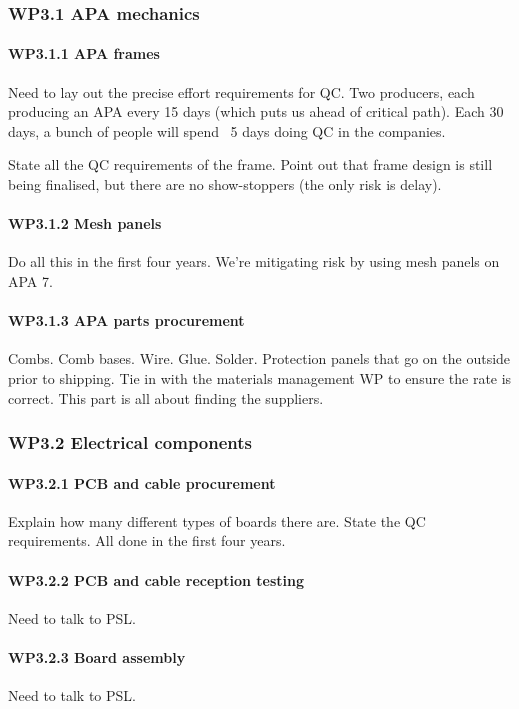 \subsubsection{WP3.1 APA mechanics}
\paragraph{WP3.1.1 APA frames}
Need to lay out the precise effort requirements for QC. Two producers, each producing an APA every 15 days (which puts us ahead of critical path). Each 30 days, a bunch of people will spend ~5 days doing QC in the companies.

State all the QC requirements of the frame. Point out that frame design is still being finalised, but there are no show-stoppers (the only risk is delay).

\paragraph{WP3.1.2 Mesh panels}
Do all this in the first four years. We're mitigating risk by using mesh panels on APA 7.

\paragraph{WP3.1.3 APA parts procurement}

Combs. Comb bases. Wire. Glue. Solder. Protection panels that go on the outside prior to shipping. Tie in with the materials management WP to ensure the rate is correct. This part is all about finding the suppliers.

\subsubsection{WP3.2 Electrical components}
\paragraph{WP3.2.1 PCB and cable procurement}
Explain how many different types of boards there are.
State the QC requirements.
All done in the first four years.

\paragraph{WP3.2.2 PCB and cable reception testing}
Need to talk to PSL.

\paragraph{WP3.2.3 Board assembly}
Need to talk to PSL.

